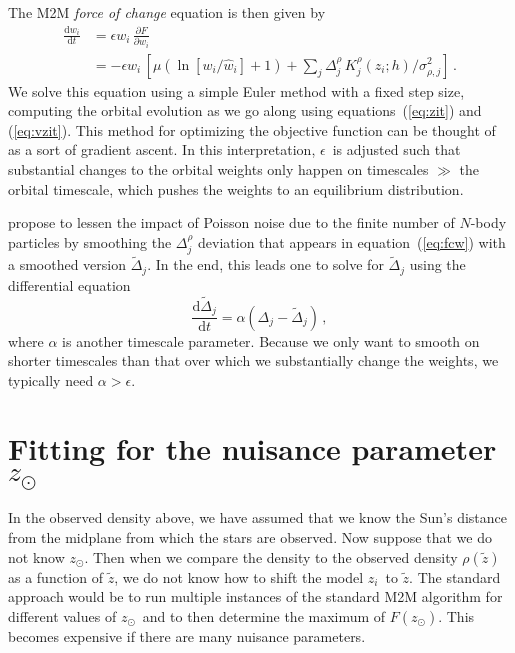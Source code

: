 \documentclass[12pt,preprint]{aastex}
\newcommand{\dd}{\mathrm{d}}
\newcommand{\eqnname}{equation}
\newcommand{\equationname}{\eqnname}
\newcommand{\zsun}{\ensuremath{z_\odot}}
\newcommand{\zi}{\ensuremath{z_i}}
\newcommand{\wi}{\ensuremath{w_i}}
\newcommand{\zobs}{\ensuremath{\tilde{z}}}
\newcommand{\eps}{\ensuremath{\epsilon}}
\begin{document}
The M2M \emph{force of change} equation is then given by
\begin{equation}
\begin{split}\label{eq:fcw}
  \frac{\dd \wi}{\dd t} & = \eps \wi\,\frac{\partial F}{\partial \wi}\\
  & = -\eps \wi \,\left[\mu \left(\ln\left[w_i/\hat{w}_i\right]+1\right)+ \sum_j \Delta^\rho_j\, K^\rho_j(\zi;h)/\sigma_{\rho,j}^2 \right]\,.
\end{split}
\end{equation}
We solve this equation using a simple Euler method with a fixed step
size, computing the orbital evolution as we go along using
\equationname s~(\ref{eq:zit}) and (\ref{eq:vzit}). This method for
optimizing the objective function can be thought of as a sort of
gradient ascent. In this interpretation, \eps\ is adjusted such that
substantial changes to the orbital weights only happen on timescales
$\gg$ the orbital timescale, which pushes the weights to an
equilibrium distribution.

\citet{Syer96a} propose to lessen the impact of Poisson noise due to
the finite number of $N$-body particles by smoothing the
$\Delta^\rho_j$ deviation that appears in \equationname~(\ref{eq:fcw})
with a smoothed version $\tilde{\Delta}_j$. In the end, this leads one
to solve for $\tilde{\Delta}_j$ using the differential equation
\begin{equation}
  \frac{\dd \tilde{\Delta}_j}{\dd t} = \alpha \left(\Delta_j-\tilde{\Delta}_j\right)\,,
\end{equation}
where $\alpha$ is another timescale parameter. Because we only want to
smooth on shorter timescales than that over which we substantially
change the weights, we typically need $\alpha > \eps$.

\section{Fitting for the nuisance parameter \protect\zsun}

In the observed density above, we have assumed that we know the Sun's
distance from the midplane from which the stars are observed. Now
suppose that we do not know \zsun. Then when we compare the density to
the observed density $\rho(\zobs)$ as a function of \zobs, we do not
know how to shift the model \zi\ to \zobs. The standard approach would
be to run multiple instances of the standard M2M algorithm for
different values of \zsun\ and to then determine the maximum of
$F(\zsun)$. This becomes expensive if there are many nuisance
parameters.
\end{document}
